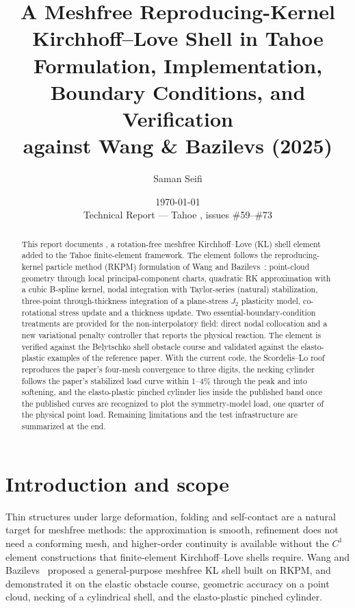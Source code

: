 \documentclass[11pt,a4paper]{article}
\title{\textbf{A Meshfree Reproducing-Kernel Kirchhoff--Love Shell in Tahoe}\\[4pt]
  \large Formulation, Implementation, Boundary Conditions, and Verification\\
  \large against Wang \& Bazilevs (2025)}
\author{Saman Seifi}
\date{\today \\[6pt] \small Technical Report --- Tahoe \code{develop}, issues \#59--\#73}
\DeclareRobustCommand{\code}[1]{\texttt{\seqsplit{#1}}}
\begin{document}
\maketitle

\begin{abstract}
This report documents \code{RKShellT}, a rotation-free meshfree Kirchhoff--Love (KL) shell element
added to the Tahoe finite-element framework. The element follows the reproducing-kernel particle
method (RKPM) formulation of Wang and Bazilevs~\cite{WangBazilevs2025}: point-cloud geometry
through local principal-component charts, quadratic RK approximation with a cubic B-spline kernel,
nodal integration with Taylor-series (natural) stabilization, three-point through-thickness
integration of a plane-stress $J_2$ plasticity model, co-rotational stress update and a thickness
update. Two essential-boundary-condition treatments are provided for the non-interpolatory field:
direct nodal collocation and a new variational penalty controller that reports the physical
reaction. The element is verified against the Belytschko shell obstacle course and validated
against the elasto-plastic examples of the reference paper. With the current code, the
Scordelis--Lo roof reproduces the paper's four-mesh convergence to three digits, the necking
cylinder follows the paper's stabilized load curve within 1--4\% through the peak and into
softening, and the elasto-plastic pinched cylinder lies inside the published band once the
published curves are recognized to plot the symmetry-model load, one quarter of the physical
point load. Remaining limitations and the test infrastructure are summarized at the end.
\end{abstract}

\tableofcontents
\clearpage

\section{Introduction and scope}\label{sec:intro}

Thin structures under large deformation, folding and self-contact are a natural target for
meshfree methods: the approximation is smooth, refinement does not need a conforming mesh, and
higher-order continuity is available without the $C^1$ element constructions that finite-element
Kirchhoff--Love shells require. Wang and Bazilevs~\cite{WangBazilevs2025} proposed a
general-purpose meshfree KL shell built on RKPM, and demonstrated it on the elastic obstacle
course, geometric accuracy on a point cloud, necking of a cylindrical shell, and the elasto-plastic
pinched cylinder.
\end{document}

